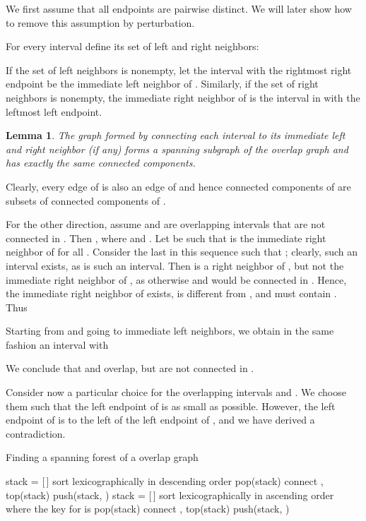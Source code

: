 \documentclass[paper=a4]{scrartcl}
\newtheorem{lemma}{Lemma}
\newcommand{\qed}{}
\newcommand{\mqed}{\hfill}
\newlength{\proofpostskipamount}\newlength{\proofpreskipamount}
\newenvironment{proof}{\par\vspace{\proofpreskipamount}\noindent{\textbf{Proof:}}\hspace{0.5em}}{\nopagebreak \strut\nopagebreak \hspace{\fill}\mqed\par\vspace{\proofpostskipamount}\noindent}
\begin{document}
We first assume that all endpoints are pairwise distinct. We will later show how to remove this assumption by perturbation.

For every interval  define its set of left and right neighbors:

If the set of left neighbors is nonempty, let the interval  with the rightmost right endpoint be the immediate left neighbor of . Similarly, if the set of right neighbors is nonempty, the immediate right neighbor of  is the interval in  with the leftmost left endpoint.

\begin{lemma} The graph  formed by connecting each interval to its immediate left and right neighbor (if any) forms a spanning subgraph of the overlap graph  and has exactly the same connected components.
\end{lemma}
\begin{proof} Clearly, every edge of  is also an edge of  and hence
  connected components of  are subsets of connected components of .

For the other direction, assume  and  are overlapping intervals that are not connected in . Then , where  and . Let  be such that  is the immediate right neighbor of  for all . Consider the last  in this sequence such that ; clearly, such an interval exists, as  is such an interval. Then  is a right neighbor of , but not the immediate right neighbor of , as otherwise  and  would be connected in . Hence, the immediate right neighbor  of  exists, is different from , and must contain . Thus

Starting from  and going to immediate left neighbors, we obtain in the same fashion an interval  with

We conclude that  and  overlap, but are not connected in . 

Consider now a particular choice for the overlapping intervals  and . We choose them such that the left endpoint of  is as small as possible. However, the left endpoint of  is to the left of the left endpoint of , and we have derived a contradiction. \qed
\end{proof}

\begin{algorithm}[t]
\caption{Finding a spanning forest of a overlap graph}
\label{alg:spanning_tree}
\begin{algorithmic}
	\State stack = [\,]
	\State sort  lexicographically in descending order
	    \State pop(stack)
	  \EndWhile
	    \State connect , top(stack)
	  \EndIf
	  \State push(stack, )
	\EndFor
	\State stack = [\,]
	\State sort  lexicographically in ascending order where the key for  is 
	    \State pop(stack)
	  \EndWhile
	    \State connect , top(stack)
	  \EndIf
	  \State push(stack, )
	\EndFor
	\EndProcedure
\end{algorithmic}
\end{algorithm}
\end{document}
